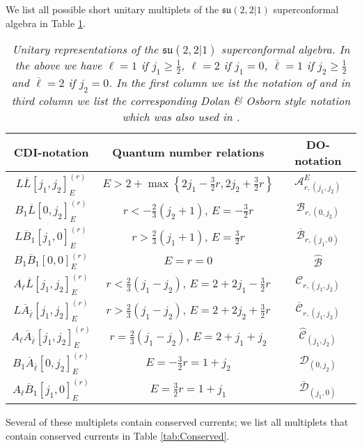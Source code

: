 \documentclass[main.tex]{subfiles}
\begin{document}
We list all possible short unitary multiplets of the $\mathfrak{su}(2,2|1)$ superconformal algebra in Table \ref{tab:shorts}.
\begin{table}
\centering
\begin{tabular}{|c|c|c|}
\hline
CDI-notation&Quantum number relations& DO-notation\\\hline\hline
$L\overline{L}[j_1,j_2]_{E}^{(r)}$&$E>2+\max\left\{2j_1-\frac{3}{2}r,2j_2+\frac{3}{2}r\right\}$&$\mathcal{A}^E_{r,(j_1,j_2)}$\\\hline\hline
$B_1\overline{L}[0,j_2]_E^{(r)}$&$r<-\frac{2}{3}(j_2+1)$, $E=-\frac{3}{2}r$&$\mathcal{B}_{r,(0,j_2)}$\\\hline
$L\overline{B}_1[j_1,0]_E^{(r)}$&$r>\frac{2}{3}(j_1+1)$, $E=\frac{3}{2}r$&$\overline{\mathcal{B}}_{r,(j_1,0)}$\\\hline
$B_1\overline{B}_1[0,0]_E^{(r)}$&$E=r=0$&$\hat{\mathcal{B}}$\\\hline\hline
$A_{\ell}\overline{L}[j_1,j_2]_E^{(r)}$&$r<\frac{2}{3}(j_1-j_2)$, $E=2+2j_1-\frac{3}{2}r$&$\mathcal{C}_{r,(j_1,j_2)}$\\\hline
$L\overline{A}_{\overline{\ell}}[j_1,j_2]_E^{(r)}$&$r>\frac{2}{3}(j_1-j_2)$, $E=2+2j_2+\frac{3}{2}r$&$\overline{\mathcal{C}}_{r,(j_1,j_2)}$\\\hline
$A_{\ell}\overline{A}_{\overline{\ell}}[j_1,j_2]_E^{(r)}$&$r=\frac{2}{3}(j_1-j_2)$, $E=2+j_1+j_2$&$\hat{\mathcal{C}}_{(j_1,j_2)}$\\\hline\hline
$B_1\overline{A}_{\overline{\ell}}[0,j_2]_E^{(r)}$&$E=-\frac{3}{2}r=1+j_2$&$\mathcal{D}_{(0,j_2)}$\\\hline
$A_{\ell}\overline{B}_1[j_1,0]_E^{(r)}$&$E=\frac{3}{2}r=1+j_1$&$\overline{\mathcal{D}}_{(j_1,0)}$\\\hline
\end{tabular}
\caption{\textit{Unitary representations of the $\mathfrak{su}(2,2|1)$ superconformal algebra. In the above we have $\ell=1$ if $j_1\geq\frac{1}{2}$, $\ell=2$ if $j_1=0$, $\overline{\ell}=1$ if $j_2\geq\frac{1}{2}$ and $\overline{\ell}=2$ if $j_2=0$. In the first column we ist the notation of \cite{Cordova:2016emh} and in third column we list the corresponding Dolan \& Osborn style notation \cite{Dolan:2002zh} which was also used in \cite{Liendo:2011wc,Beem:2012yn,Rastelli:2016tbz,Gadde:2010en}.}}
\label{tab:shorts}
\end{table}
Several of these multiplets contain conserved currents; we list all multiplets that contain conserved currents in Table \ref{tab:Conserved}. 
\end{document}

